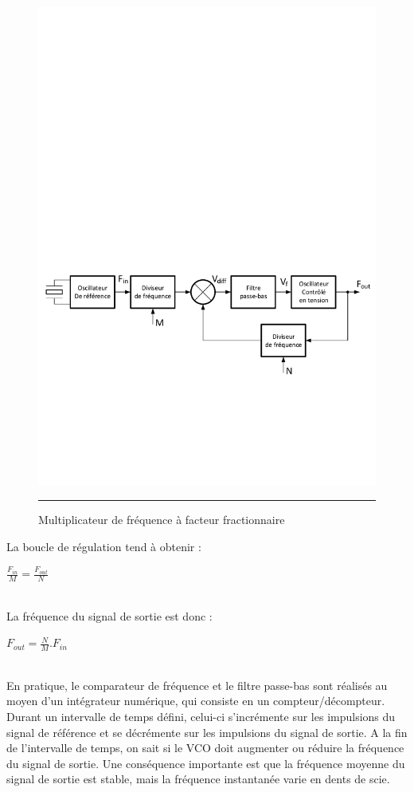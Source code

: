\begin{figure}[htb]
  \centering
  \includegraphics [angle=0, width=14cm]{./Figures/Chap6_Horloges/FLL_Frac.pdf}
  \rule{35em}{0.5pt}
  \caption{Multiplicateur de fréquence à facteur fractionnaire}
  \label{fig:FLL_Frac}
\end{figure}

La boucle de régulation tend à obtenir :\begin{LARGE} $\frac{F_{in}}{M}=\frac{F_{out}}{N}$ \end{LARGE}\\

La fréquence du signal de sortie est donc :\begin{LARGE} $F_{out}=\frac{N}{M}.F_{in}$\end{LARGE}\\

En pratique, le comparateur de fréquence et le filtre passe-bas sont réalisés au moyen d'un intégrateur numérique, qui consiste en un compteur/décompteur. Durant un intervalle de temps défini, celui-ci s'incrémente sur les impulsions du signal de référence et se décrémente sur les impulsions du signal de sortie. A la fin de l'intervalle de temps, on sait si le VCO doit augmenter ou réduire la fréquence du signal de sortie. Une conséquence importante est que la fréquence moyenne du signal de sortie est stable, mais la fréquence instantanée varie en dents de scie.

